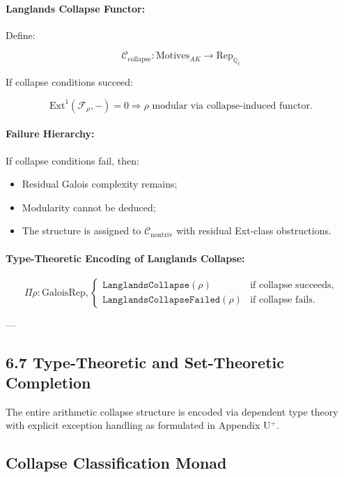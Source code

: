 \documentclass[11pt]{article}
\begin{document}
\paragraph{Langlands Collapse Functor:}
Define:

\[
\mathcal{C}_{\mathrm{collapse}} : \mathrm{Motives}_{AK} \longrightarrow \mathrm{Rep}_{\mathbb{Q}_\ell}
\]

If collapse conditions succeed:

\[
\mathrm{Ext}^1(\mathcal{F}_\rho, -) = 0 \Rightarrow \rho \text{ modular via collapse-induced functor}.
\]

\paragraph{Failure Hierarchy:}
If collapse conditions fail, then:

\begin{itemize}
    \item Residual Galois complexity remains;
    \item Modularity cannot be deduced;
    \item The structure is assigned to \( \mathcal{C}_{\mathrm{nontriv}} \) with residual Ext-class obstructions.
\end{itemize}

\paragraph{Type-Theoretic Encoding of Langlands Collapse:}

\[
\Pi \rho : \mathrm{GaloisRep},
\begin{cases}
\texttt{LanglandsCollapse}(\rho) & \text{if collapse succeeds}, \\
\texttt{LanglandsCollapseFailed}(\rho) & \text{if collapse fails}.
\end{cases}
\]

---

\subsection*{6.7 Type-Theoretic and Set-Theoretic Completion}

The entire arithmetic collapse structure is encoded via dependent type theory with explicit exception handling as formulated in Appendix U$^{+}$.

\subsection*{Collapse Classification Monad}
\end{document}
